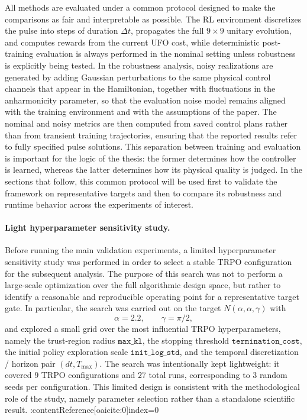 All methods are evaluated under a common protocol designed to make the comparisons as fair and interpretable as possible. The RL environment discretizes the pulse into steps of duration \(\Delta t\), propagates the full \(9\times 9\) unitary evolution, and computes rewards from the current UFO cost, while deterministic post-training evaluation is always performed in the nominal setting unless robustness is explicitly being tested. In the robustness analysis, noisy realizations are generated by adding Gaussian perturbations to the same physical control channels that appear in the Hamiltonian, together with fluctuations in the anharmonicity parameter, so that the evaluation noise model remains aligned with the training environment and with the assumptions of the paper. The nominal and noisy metrics are then computed from saved control plans rather than from transient training trajectories, ensuring that the reported results refer to fully specified pulse solutions. This separation between training and evaluation is important for the logic of the thesis: the former determines how the controller is learned, whereas the latter determines how its physical quality is judged. In the sections that follow, this common protocol will be used first to validate the framework on representative targets and then to compare its robustness and runtime behavior across the experiments of interest.


\paragraph{Light hyperparameter sensitivity study.}
\label{par:light_hyperparameter_sensitivity}

Before running the main validation experiments, a limited hyperparameter sensitivity study was performed in order to select a stable TRPO configuration for the subsequent analysis. The purpose of this search was not to perform a large-scale optimization over the full algorithmic design space, but rather to identify a reasonable and reproducible operating point for a representative target gate. In particular, the search was carried out on the target \(N(\alpha,\alpha,\gamma)\) with
\begin{equation}
\alpha = 2.2,
\qquad
\gamma = \pi/2,
\label{eq:representative_target_tuning}
\end{equation}
and explored a small grid over the most influential TRPO hyperparameters, namely the trust-region radius \(\texttt{max\_kl}\), the stopping threshold \(\texttt{termination\_cost}\), the initial policy exploration scale \(\texttt{init\_log\_std}\), and the temporal discretization / horizon pair \((dt, T_{\max})\). The search was intentionally kept lightweight: it covered \(9\) TRPO configurations and \(27\) total runs, corresponding to \(3\) random seeds per configuration. This limited design is consistent with the methodological role of the study, namely parameter selection rather than a standalone scientific result. :contentReference[oaicite:0]{index=0}

